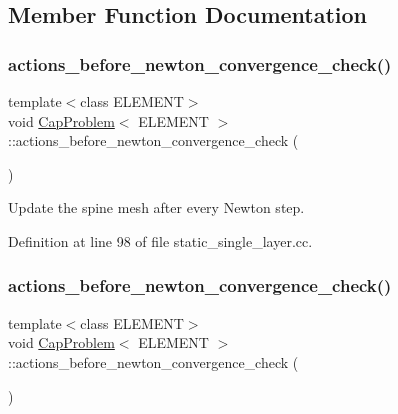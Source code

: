\subsection{Member Function Documentation}
\mbox{\label{classCapProblem_ac852570b51489f4bf744b6063fbfa01a}} 
\subsubsection{\texorpdfstring{actions\+\_\+before\+\_\+newton\+\_\+convergence\+\_\+check()}{actions\_before\_newton\_convergence\_check()}\hspace{0.1cm}{\footnotesize\ttfamily [1/2]}}
{\footnotesize\ttfamily template$<$class E\+L\+E\+M\+E\+NT$>$ \\
void \hyperlink{classCapProblem}{Cap\+Problem}$<$ E\+L\+E\+M\+E\+NT $>$\+::actions\+\_\+before\+\_\+newton\+\_\+convergence\+\_\+check (\begin{DoxyParamCaption}{ }\end{DoxyParamCaption})\hspace{0.3cm}{\ttfamily [inline]}}



Update the spine mesh after every Newton step. 



Definition at line 98 of file static\+\_\+single\+\_\+layer.\+cc.

\mbox{\label{classCapProblem_ac852570b51489f4bf744b6063fbfa01a}} 
\subsubsection{\texorpdfstring{actions\+\_\+before\+\_\+newton\+\_\+convergence\+\_\+check()}{actions\_before\_newton\_convergence\_check()}\hspace{0.1cm}{\footnotesize\ttfamily [2/2]}}
{\footnotesize\ttfamily template$<$class E\+L\+E\+M\+E\+NT$>$ \\
void \hyperlink{classCapProblem}{Cap\+Problem}$<$ E\+L\+E\+M\+E\+NT $>$\+::actions\+\_\+before\+\_\+newton\+\_\+convergence\+\_\+check (\begin{DoxyParamCaption}{ }\end{DoxyParamCaption})\hspace{0.3cm}{\ttfamily [inline]}}



